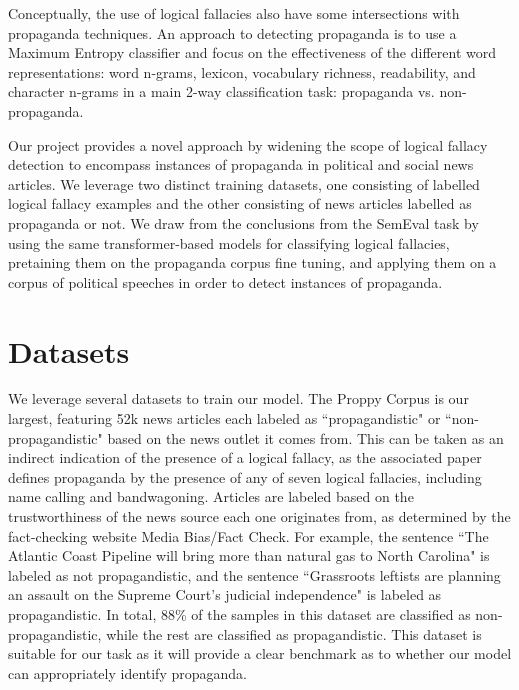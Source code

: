 \documentclass[conference]{IEEEtran}
\begin{document}
Conceptually, the use of logical fallacies also have some intersections with propaganda techniques. An approach to detecting propaganda \cite{Proppy} is to use a Maximum Entropy classifier %
and focus on the effectiveness of the different word representations: word n-grams, lexicon, vocabulary richness, readability, and character n-grams in a main 2-way classification task: propaganda vs. non-propaganda.


Our project provides a novel approach by widening the scope of logical fallacy detection to encompass instances of propaganda in political and social news articles. We leverage two distinct training datasets, one consisting of labelled logical fallacy examples and the other consisting of news articles labelled as propaganda or not. We draw from the conclusions from the SemEval task by using the same transformer-based models for classifying logical fallacies, pretaining them on the propaganda corpus fine tuning, and applying them on a corpus of political speeches in order to detect instances of propaganda.

\section{Datasets}



We leverage several datasets to train our model. The Proppy Corpus is our largest, featuring 52k news articles each labeled as ``propagandistic" or ``non-propagandistic" based on the news outlet it comes from. This can be taken as an indirect indication of the presence of a logical fallacy, as the associated paper\cite{Proppy} defines propaganda by the presence of any of seven logical fallacies, including name calling and bandwagoning. Articles are labeled based on the trustworthiness of the news source each one originates from, as determined by the fact-checking website Media Bias/Fact Check. For example, the sentence ``The Atlantic Coast Pipeline will bring more than natural gas to North Carolina" is labeled as not propagandistic, and the sentence ``Grassroots leftists are planning an assault on the Supreme Court's judicial independence" is labeled as propagandistic. In total, 88\% of the samples in this dataset are classified as non-propagandistic, while the rest are classified as propagandistic. This dataset is suitable for our task as it will provide a clear benchmark as to whether our model can appropriately identify propaganda.
\end{document}
